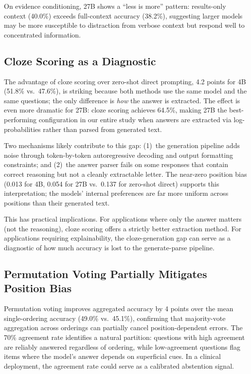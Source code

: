 \documentclass[runningheads,a4paper]{llncs}
\begin{document}
On evidence conditioning, 27B shows a ``less is more'' pattern: results-only context (40.0\%) exceeds full-context accuracy (38.2\%), suggesting larger models may be more susceptible to distraction from verbose context but respond well to concentrated information.

\subsection{Cloze Scoring as a Diagnostic}

The advantage of cloze scoring over zero-shot direct prompting, 4.2 points for 4B (51.8\% vs.\ 47.6\%), is striking because both methods use the same model and the same questions; the only difference is \textit{how} the answer is extracted. The effect is even more dramatic for 27B: cloze scoring achieves 64.5\%, making 27B the best-performing configuration in our entire study when answers are extracted via log-probabilities rather than parsed from generated text.

Two mechanisms likely contribute to this gap: (1)~the generation pipeline adds noise through token-by-token autoregressive decoding and output formatting constraints; and (2)~the answer parser fails on some responses that contain correct reasoning but not a cleanly extractable letter. The near-zero position bias (0.013 for 4B, 0.054 for 27B vs.\ 0.137 for zero-shot direct) supports this interpretation; the models' internal preferences are far more uniform across positions than their generated text.

This has practical implications. For applications where only the answer matters (not the reasoning), cloze scoring offers a strictly better extraction method. For applications requiring explainability, the cloze-generation gap can serve as a diagnostic of how much accuracy is lost to the generate-parse pipeline.

\subsection{Permutation Voting Partially Mitigates Position Bias}

Permutation voting improves aggregated accuracy by 4 points over the mean single-ordering accuracy (49.0\% vs.\ 45.1\%), confirming that majority-vote aggregation across orderings can partially cancel position-dependent errors. The 70\% agreement rate identifies a natural partition: questions with high agreement are reliably answered regardless of ordering, while low-agreement questions flag items where the model's answer depends on superficial cues. In a clinical deployment, the agreement rate could serve as a calibrated abstention signal.
\end{document}
